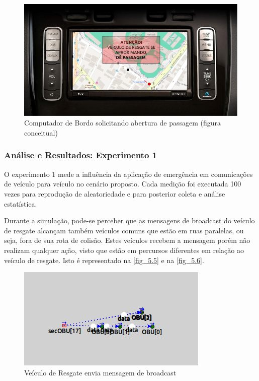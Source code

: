 \documentclass[
12pt,				%
openright,			%
oneside,			%
a4paper,			%
brazil,				%
]{abntex2}
\begin{document}
	\begin{figure}[H]
		\centering
		\includegraphics[scale=.65]{figuras/cap5/54ConceitoComputadorDeBordo}
		\caption{\label{fig_5.4}Computador de Bordo solicitando abertura de passagem (figura conceitual)}
	\end{figure}
	
	\subsubsection{Análise e Resultados: Experimento 1}
	
	\par O experimento 1 mede a influência da aplicação de emergência em comunicações de veículo para veículo no cenário proposto. Cada medição foi executada 100 vezes para reprodução de aleatoriedade e para posterior coleta e análise estatística.
	
	\par Durante a simulação, pode-se perceber que as mensagens de broadcast do veículo de resgate alcançam também veículos comuns que estão em ruas paralelas, ou seja, fora de sua rota de colisão. Estes veículos recebem a mensagem porém não realizam qualquer ação, visto que estão em percursos diferentes em relação ao veículo de resgate. Isto é representado na \autoref{fig_5.5} e na \autoref{fig_5.6}.
	
	\begin{figure}[H]
		\centering
		\includegraphics[scale=.9]{figuras/cap5/55Experimento1TkEnv}
		\caption{\label{fig_5.5}Veículo de Resgate envia mensagem de broadcast}
	\end{figure}
	
\end{document}
